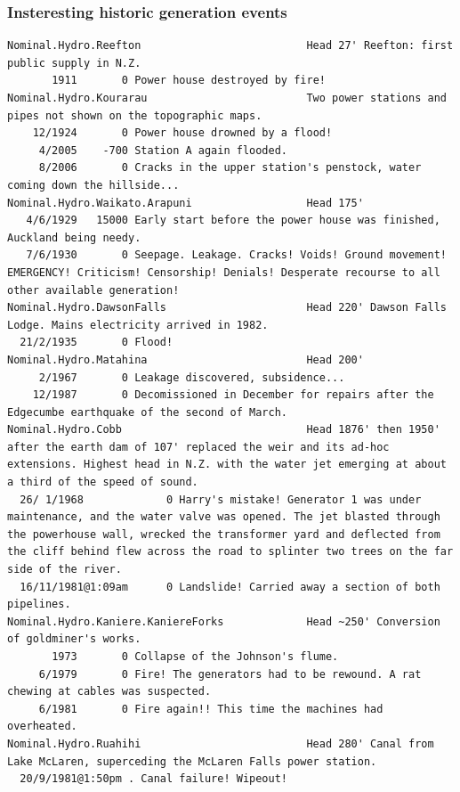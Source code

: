 \documentclass[aspectratio=169]{beamer}
\begin{document}

\begin{frame}[fragile]
  \frametitle{Insteresting historic generation events}
  \scriptsize
  \begin{verbatim}
Nominal.Hydro.Reefton                          Head 27' Reefton: first public supply in N.Z.
       1911       0 Power house destroyed by fire!
Nominal.Hydro.Kourarau                         Two power stations and pipes not shown on the topographic maps.
    12/1924       0 Power house drowned by a flood!
     4/2005    -700 Station A again flooded.
     8/2006       0 Cracks in the upper station's penstock, water coming down the hillside...
Nominal.Hydro.Waikato.Arapuni                  Head 175'
   4/6/1929   15000 Early start before the power house was finished, Auckland being needy.
   7/6/1930       0 Seepage. Leakage. Cracks! Voids! Ground movement! EMERGENCY! Criticism! Censorship! Denials! Desperate recourse to all other available generation!
Nominal.Hydro.DawsonFalls                      Head 220' Dawson Falls Lodge. Mains electricity arrived in 1982.
  21/2/1935       0 Flood!
Nominal.Hydro.Matahina                         Head 200'
     2/1967       0 Leakage discovered, subsidence...
    12/1987       0 Decomissioned in December for repairs after the Edgecumbe earthquake of the second of March.
Nominal.Hydro.Cobb                             Head 1876' then 1950' after the earth dam of 107' replaced the weir and its ad-hoc extensions. Highest head in N.Z. with the water jet emerging at about a third of the speed of sound.
  26/ 1/1968             0 Harry's mistake! Generator 1 was under maintenance, and the water valve was opened. The jet blasted through the powerhouse wall, wrecked the transformer yard and deflected from the cliff behind flew across the road to splinter two trees on the far side of the river.
  16/11/1981@1:09am      0 Landslide! Carried away a section of both pipelines.
Nominal.Hydro.Kaniere.KaniereForks             Head ~250' Conversion of goldminer's works.
       1973       0 Collapse of the Johnson's flume.
     6/1979       0 Fire! The generators had to be rewound. A rat chewing at cables was suspected.
     6/1981       0 Fire again!! This time the machines had overheated.
Nominal.Hydro.Ruahihi                          Head 280' Canal from Lake McLaren, superceding the McLaren Falls power station.
  20/9/1981@1:50pm . Canal failure! Wipeout!
  \end{verbatim}
\end{frame}
\end{document}

